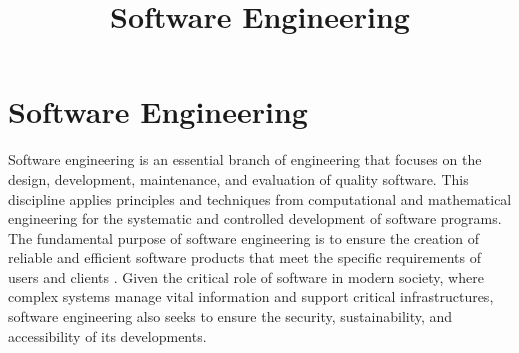 \documentclass[a4,10pt]{article}
\title{Software Engineering}
\begin{document}
\section{Software Engineering}
Software engineering is an essential branch of engineering that focuses on the design, development, maintenance, and evaluation of quality software. This discipline applies principles and techniques from computational and mathematical engineering for the systematic and controlled development of software programs. The fundamental purpose of software engineering is to ensure the creation of reliable and efficient software products that meet the specific requirements of users and clients \cite{Sommerville2010}. Given the critical role of software in modern society, where complex systems manage vital information and support critical infrastructures, software engineering also seeks to ensure the security, sustainability, and accessibility of its developments.

\printbibliography
\end{document}
